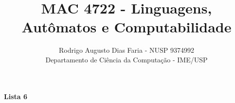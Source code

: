\documentclass[12pt]{article}
\begin{document}
\title{MAC 4722 - Linguagens, Autômatos e Computabilidade}
\author{Rodrigo Augusto Dias Faria - NUSP 9374992\\
Departamento de Ciência da Computação - IME/USP}

\maketitle

\begin{comment}
\begin{center}
\textbf{\large{Lista 1}}
\end{center}




\begin{center}
\textbf{\large{Lista 2}}
\end{center}





\begin{center}
\textbf{\large{Lista 3}}
\end{center}





\begin{center}
\textbf{\large{Lista 4}}
\end{center}







\begin{center}
\textbf{\large{Lista 5}}
\end{center}





\end{comment}

\begin{center}
\textbf{\large{Lista 6}}
\end{center}






\printbibliography
\end{document}
